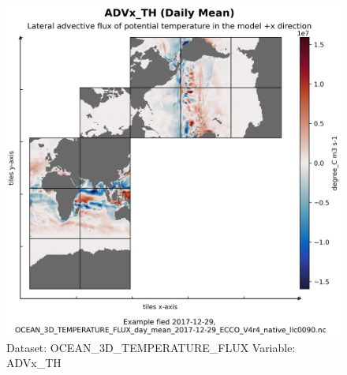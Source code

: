 \begin{figure}[H]
\centering
\includegraphics[width=\textwidth]{../images/plots/native_plots/Ocean_Three-Dimensional_Potential_Temperature_Fluxes/ADVx_TH.png}
\caption{Dataset: OCEAN\_3D\_TEMPERATURE\_FLUX Variable: ADVx\_TH}
\label{tab:table-OCEAN_3D_TEMPERATURE_FLUX_ADVx_TH-Plot}
\end{figure}
\pagebreak
